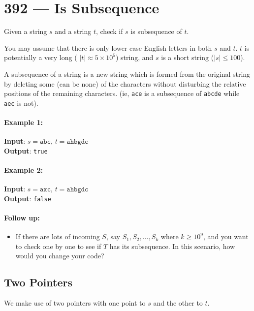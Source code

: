 \section{392 --- Is Subsequence}
Given a string $ s $ and a string $ t $, check if $ s $ is subsequence of $ t $.
\par
You may assume that there is only lower case English letters in both $ s $ and $ t $. $ t $ is potentially a very long ( $\lvert t\rvert \approx 5\times 10^5$) string, and $ s $ is a short string ($\lvert s\rvert\leq 100$).
\par
A subsequence of a string is a new string which is formed from the original string by deleting some (can be none) of the characters without disturbing the relative positions of the remaining characters. (ie, \texttt{ace} is a subsequence of \texttt{abcde} while \texttt{aec} is not).

\paragraph{Example 1:}
\begin{flushleft}
\textbf{Input}: $s = \texttt{abc}$, $t = \texttt{ahbgdc}$
\\
\textbf{Output}: \texttt{true}
\end{flushleft}

\paragraph{Example 2:}
\begin{flushleft}
\textbf{Input}: $s = \texttt{axc}$, $t = \texttt{ahbgdc}$
\\
\textbf{Output}: \texttt{false}
\end{flushleft}

\paragraph{Follow up:}
\begin{itemize}
\item If there are lots of incoming $ S $, say $S_1, S_2, \ldots , S_k$ where $k \geq 10^9$, and you want to check one by one to see if $T$ has its subsequence. In this scenario, how would you change your code?
\end{itemize}

\subsection{Two Pointers}
We make use of two pointers with one point to $s$ and the other to $t$.

